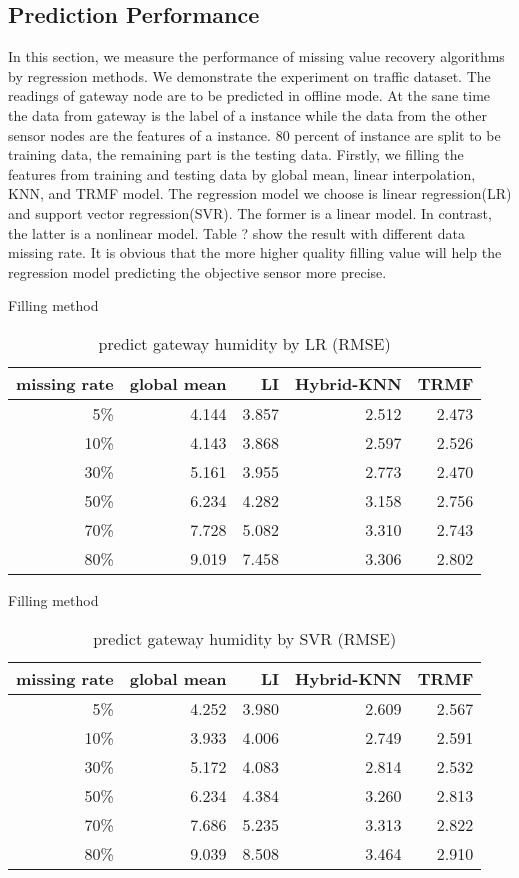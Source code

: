 \subsection{Prediction Performance}
In this section, we measure the performance of missing value recovery algorithms by regression methods.
We demonstrate the experiment on traffic dataset.
The readings of gateway node are to be predicted in offline mode.
At the sane time the data from gateway is the label of a instance while the data from the other sensor nodes are the features of a instance.
80 percent of instance are split to be training data, the remaining part is the testing data.
Firstly, we filling the features from training and testing data by global mean, linear interpolation, KNN, and TRMF model.
The regression model we choose is linear regression(LR) and support vector regression(SVR).
The former is a linear model.
In contrast, the latter is a nonlinear model.
Table ? show the result with different data missing rate.
It is obvious that the more higher quality filling value will help the regression model predicting the objective sensor more precise.

\begin{table} [htbp]
\centering
\caption{predict gateway humidity by LR (RMSE) }
\label{table: LR}
   Filling method
\begin{tabular}{ r | r r r r}
        missing rate&global mean     &LI   &Hybrid-KNN &TRMF\\ \hline
        5\%      &4.144&3.857&2.512&2.473\\
        10\%    &4.143&3.868& 2.597&2.526\\
        30\%    &5.161&3.955&2.773&2.470\\
        50\%    &6.234&4.282&3.158&2.756\\
        70\%   &7.728&5.082&3.310&2.743\\
        80\%   &9.019&7.458&3.306&2.802\\
\end{tabular}
\end{table}

\begin{table}[htbp]
\centering
\caption{predict gateway humidity by SVR (RMSE) }
\label{table: SVR}
   Filling method
\begin{tabular}{ r | r r r r}
        missing rate&global mean     &LI   &Hybrid-KNN &TRMF\\ \hline
        5\%&4.252&3.980&2.609&2.567\\
        10\%    &3.933 &4.006&2.749&2.591\\
        30\%    &5.172&4.083&2.814&2.532\\
        50\%    &6.234&4.384&3.260&2.813\\
        70\%   &7.686&5.235&3.313&2.822\\
        80\%  &9.039&8.508&3.464&2.910\\
\end{tabular}
\end{table}
